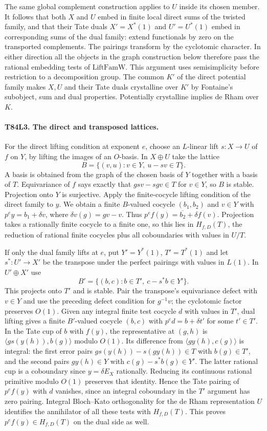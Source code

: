 The same global complement construction applies to $U$ inside
its chosen member. It follows that both $X$ and $U$ embed in
finite local direct sums of the twisted family, and that their
Tate duals $X'=X^*(1)$ and $U'=U^*(1)$ embed in corresponding
sums of the dual family: extend functionals by zero on the
transported complements. The pairings transform by the
cyclotomic character. In either direction all the objects in
the graph construction below therefore pass the rational
embedding tests of $\mathrm{LiftFamW}$. This argument uses
semisimplicity before restriction to a decomposition group.
The common $K'$ of the direct potential family makes $X,U$
and their Tate duals crystalline over $K'$ by Fontaine's
subobject, sum and dual properties. Potentially crystalline
implies de Rham over $K$.

\paragraph{T84L3. The direct and transposed lattices.}
For the direct lifting condition at exponent $e$, choose an
$L$-linear lift $s:X\to U$ of $f$ on $Y$, by lifting the
images of an $O$-basis. In $X\oplus U$ take the lattice
\[
          B=\{(v,u):v\in Y,\ u-sv\in T\}.
\]
A basis is obtained from the graph of the chosen basis of $Y$
together with a basis of $T$. Equivariance of $f$ says exactly
that $gsv-sgv\in T$ for $v\in Y$, so $B$ is stable.
Projection onto $Y$ is surjective. Apply the finite-cocycle
lifting condition of the direct family to $y$. We obtain a
finite $B$-valued cocycle $(b_1,b_2)$ and $v\in Y$ with
$p^ey=b_1+\delta v$, where $\delta v(g)=gv-v$.
Thus $p^ef(y)=\overline{b_2}+\delta f(v)$. Projection takes a
rationally finite cocycle to a finite one, so this lies in
$H_{f,D}(T)$, the reduction of rational finite cocycles plus
all coboundaries with values in $U/T$.

If only the dual family lifts at $e$, put
$Y'=Y^*(1)$, $T'=T^*(1)$ and let $s^*:U'\to X'$ be the
transpose under the perfect pairings with values in $L(1)$.
In $U'\oplus X'$ use
\[
          B'=\{(b,c):b\in T',\ c-s^*b\in Y'\}.
\]
This projects onto $T'$ and is stable. Pair the transpose's
equivariance defect with $v\in Y$ and use the preceding
defect condition for $g^{-1}v$; the cyclotomic factor
preserves $O(1)$. Given any integral finite test cocycle
$d$ with values in $T'$, dual lifting gives a finite
$B'$-valued cocycle $(b,c)$ with $p^ed=b+\delta t'$ for
some $t'\in T'$. In the Tate cup of $b$ with $f(y)$, the
representative at $(g,h)$ is
$\langle g s(y(h)),b(g)\rangle$ modulo $O(1)$.
Its difference from $\langle g y(h),c(g)\rangle$ is integral:
the first error pairs $g s(y(h))-s(g y(h))\in T$ with $b(g)\in T'$,
and the second pairs $g y(h)\in Y$ with $c(g)-s^*b(g)\in Y'$.
The latter rational cup is a coboundary since $y=\delta E_X$
rationally. Reducing its continuous rational primitive modulo
$O(1)$ preserves that identity. Hence the Tate pairing of
$p^ef(y)$ with $d$ vanishes, since an integral coboundary in
the $T'$ argument has zero pairing. Integral Bloch--Kato
orthogonality for the de Rham representation $U$ identifies
the annihilator of all these tests with $H_{f,D}(T)$.
This proves $p^ef(y)\in H_{f,D}(T)$ on the dual side as well.

